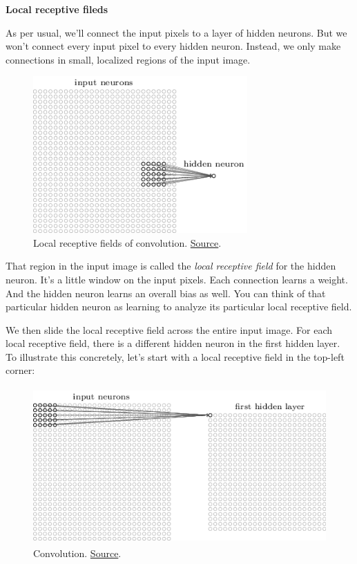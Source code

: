 \documentclass[a4paper]{tufte-handout}
\begin{document}
\noindent \textbf{Local receptive fileds}

As per usual, we'll connect the input pixels to a layer of hidden
neurons. But we won't connect every input pixel to every hidden neuron.
Instead, we only make connections in small, localized regions of the
input image.

\begin{figure}
\includegraphics[height=60mm]{conv1}
\caption{Local receptive fields of convolution.
\href{http://neuralnetworksanddeeplearning.com/chap6.html\%22}{Source}.
}
\end{figure}


That region in the input image is called the \emph{local receptive
field} for the hidden neuron. It's a little window on the input pixels.
Each connection learns a weight. And the hidden neuron learns an overall
bias as well. You can think of that particular hidden neuron as learning
to analyze its particular local receptive field.

We then slide the local receptive field across the entire input image.
For each local receptive field, there is a different hidden neuron in
the first hidden layer. To illustrate this concretely, let's start with
a local receptive field in the top-left corner:

\begin{figure}
  \includegraphics[height=60mm]{conv2}
  \caption{Convolution.
\href{http://neuralnetworksanddeeplearning.com/chap6.html\%22}{Source}.
}
\end{figure}
\end{document}

